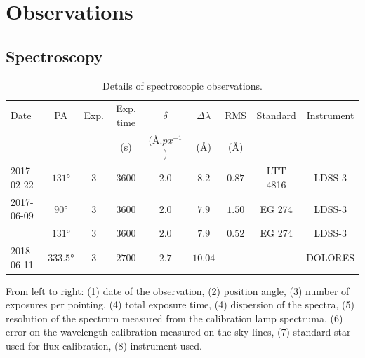 \documentclass[../main.tex]{subfiles}
\begin{document}
\section{Observations}
\label{sec:obs}

\subsection{Spectroscopy}
\label{sec:obs_spec}

\begin{table}
    \centering
    \caption{Details of spectroscopic observations.}
    \label{tab:obs_spec}
    \small
    \begin{threeparttable}
    \begin{tabular}{lcccccccc}
    \hline
    \hline
    Date& PA & Exp.& Exp. time & $\delta$ & $\Delta\lambda$ & RMS &Standard&Instrument\\
    & & & (s) & ($\si{\angstrom.px^{-1}}$)& ($\si{\angstrom}$)& ($\si{\angstrom}$) & &\\   
    \hline
    2017-02-22 & $\ang{131}$ & $3$ & $3600$ & $2.0$ & $8.2$ & $0.87$ & LTT 4816&LDSS-3\\
    2017-06-09 & $\ang{90}$  & $3$ & $3600$ & $2.0$ & $7.9$ & $1.50$ & EG 274&LDSS-3\\
               & $\ang{131}$ & $3$ & $3600$ & $2.0$ & $7.9$ & $0.52$ & EG 274&LDSS-3\\
    2018-06-11 & $\ang{333.5}$ & $3$ & $2700$& $2.7$ &$10.04$&-&-& DOLORES\\
    \hline
    \end{tabular}
    \normalsize
    \begin{tablenotes}
    \item From left to right: (1) date of the observation, (2) position angle, (3) number of exposures per pointing, (4) total exposure time, (4) dispersion of the spectra, (5) resolution of the spectrum measured from the calibration lamp spectruma, (6) error on the wavelength calibration measured on the sky lines, (7) standard star used for flux calibration, (8) instrument used.
    \end{tablenotes}
    \end{threeparttable}
\end{table}
\end{document}
